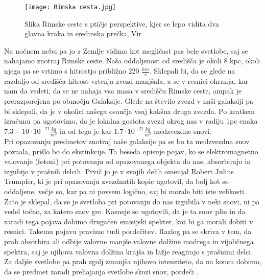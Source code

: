 \documentclass[12pt, a4paper]{article}
\begin{document}
\begin{figure}[H]
    \centering
    \texttt{[image: Rimska cesta.jpg]}
    \label{fig:rimska}
    \caption{Slika Rimske ceste s ptičje perspektive, kjer se lepo vidita dva glavna kraka in sredinska prečka, Vir \cite{galaksija}}
\end{figure}
Na nočnem nebu pa jo z Zemlje vidimo kot megličast pas bele svetlobe, saj se nahajamo znotraj Rimske ceste. Naša oddaljenost od središča je okoli 8 kpc\cite{oddaljenost}, okoli njega pa se vrtimo s hitrostjo približno 220 $\frac{km}{s}$. Sklepali bi, da se glede na razdaljo od središča hitrost vrtenja zvezd manjšala, a se v resnici ohranja, kar nam da vedeti, da se ne nahaja vsa masa v središču Rimske ceste, ampak je prerazporejena po območju Galaksije. Glede na število zvezd v naši galaksiji pa bi sklepali, da je v okolici našega osončja vsaj kakšna druga zvezda. Po kratkem izračunu pa ugotovimo, da je lokalna gostota zvezd okrog nas v radiju 1pc enaka $7.3-10 \cdot 10^{-21}\frac{kg}{m^3}$ in od tega je kar $1.7 \cdot 10^{-21}\frac{kg}{m^3}$ medzvezdne snovi.\cite{opticna} \\
Pri opazovanju predmetov znotraj naše galaksije pa se bo ta medzvezdna snov poznala, prišlo bo do ekstinkcije. Ta beseda opisuje pojav, ko se elektromagnetno valovanje (fotoni) pri potovanju od opazovanega objekta do nas, absorbirajo in izgubijo v prašnih delcih. Prvič jo je v svojih delih omenjal Robert Julius Trumpler, ki je pri opazovanju zvezdnatih kopic ugotovil, da bolj kot so oddaljene, večje so, kar pa ni povsem logično, saj bi morale biti iste velikosti. Zato je sklepal, da se je svetloba pri potovanju do nas izgubila v neki snovi, ni pa vedel točno, za katero snov gre. Kasneje so ugotovili, da je ta snov plin in da zaradi tega pojava dobimo drugačen emisijski spekter, kot bi ga morali dobiti v resnici. Takemu pojavu pravimo tudi pordečitev. Razlog pa se skriva v tem, da prah absorbira ali odbije valovne manjše valovne dolžine modrega in vijoličnega spektra, saj je njihova valovna dolžina krajša in lažje reagirajo s prašnimi delci. Za daljše svetlobe pa prah zgolj zmanjša njihovo intenziteto, da na koncu dobimo, da se predmet zaradi prehajanja svetlobe skozi snov, pordeči \cite{pordecitev}.
\end{document}
